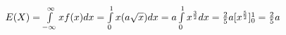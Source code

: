 $ E(X) = \int\limits_{-\infty}^{\infty}xf(x)dx = \int\limits_{0}^{1}x(a\sqrt{x})dx = a\int\limits_{0}^{1}x^{3\over 2}dx = 
\frac{2}{5} a[ x^{5 \over 2}]^{1}_{0} = \frac{2}{5} a  $
